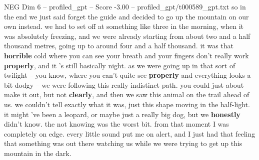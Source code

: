 \begin{textsample}{NEG Dim 6 – profiled\_gpt – Score -3.00 – profiled\_gpt/t000589\_gpt.txt}  \label{ex:f6_neg_005}
so in the end we just said forget the guide and decided to go up the mountain on our own instead. we had to set off at something like three in the morning, when it was absolutely freezing, and we were already starting from about two and a half thousand metres, going up to around four and a half thousand. it was that \textbf{horrible} cold where you can see your breath and your fingers don't really work \textbf{properly}, and it ’s still basically night. as we were going up in that sort of twilight – you know, where you can't quite see \textbf{properly} and everything looks a bit dodgy – we were following this really indistinct path. you could just about make it out, but not \textbf{clearly}, and then we saw this animal on the trail ahead of us. we couldn't tell exactly what it was, just this shape moving in the half-light. it might ’ve been a leopard, or maybe just a really big dog, but we \textbf{honestly} didn't know. the not knowing was the worst bit. from that moment I was completely on edge. every little sound put me on alert, and I just had that feeling that something was out there watching us while we were trying to get up this mountain in the dark.

\end{textsample}
